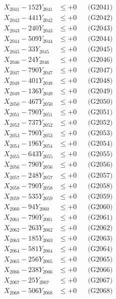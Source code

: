 \documentclass[a4paper,10pt]{article}
\begin{document}
{\begin{align}
\allowbreak
X_{2041} - 152Y_{2041} &\leq +0 && \text{(G2041)} \\
X_{2042} - 441Y_{2042} &\leq +0 && \text{(G2042)} \\
X_{2043} - 240Y_{2043} &\leq +0 && \text{(G2043)} \\
X_{2044} - 509Y_{2044} &\leq +0 && \text{(G2044)} \\
X_{2045} - 33Y_{2045} &\leq +0 && \text{(G2045)} \\
X_{2046} - 24Y_{2046} &\leq +0 && \text{(G2046)} \\
X_{2047} - 790Y_{2047} &\leq +0 && \text{(G2047)} \\
X_{2048} - 401Y_{2048} &\leq +0 && \text{(G2048)} \\
X_{2049} - 136Y_{2049} &\leq +0 && \text{(G2049)} \\
X_{2050} - 467Y_{2050} &\leq +0 && \text{(G2050)} \\
\allowbreak
X_{2051} - 790Y_{2051} &\leq +0 && \text{(G2051)} \\
X_{2052} - 737Y_{2052} &\leq +0 && \text{(G2052)} \\
X_{2053} - 790Y_{2053} &\leq +0 && \text{(G2053)} \\
X_{2054} - 196Y_{2054} &\leq +0 && \text{(G2054)} \\
X_{2055} - 643Y_{2055} &\leq +0 && \text{(G2055)} \\
X_{2056} - 790Y_{2056} &\leq +0 && \text{(G2056)} \\
X_{2057} - 248Y_{2057} &\leq +0 && \text{(G2057)} \\
X_{2058} - 790Y_{2058} &\leq +0 && \text{(G2058)} \\
X_{2059} - 535Y_{2059} &\leq +0 && \text{(G2059)} \\
X_{2060} - 94Y_{2060} &\leq +0 && \text{(G2060)} \\
\allowbreak
X_{2061} - 790Y_{2061} &\leq +0 && \text{(G2061)} \\
X_{2062} - 263Y_{2062} &\leq +0 && \text{(G2062)} \\
X_{2063} - 185Y_{2063} &\leq +0 && \text{(G2063)} \\
X_{2064} - 581Y_{2064} &\leq +0 && \text{(G2064)} \\
X_{2065} - 256Y_{2065} &\leq +0 && \text{(G2065)} \\
X_{2066} - 238Y_{2066} &\leq +0 && \text{(G2066)} \\
X_{2067} - 25Y_{2067} &\leq +0 && \text{(G2067)} \\
X_{2068} - 506Y_{2068} &\leq +0 && \text{(G2068)} \\

\end{align}}
\end{document}
